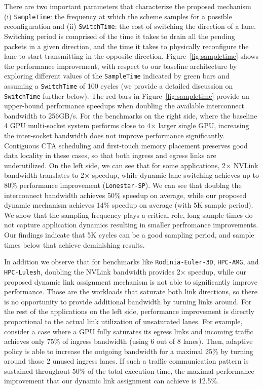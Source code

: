 There are two important parameters that characterize the proposed mechanism (i)
\texttt{SampleTime}: the frequency at which the scheme samples for a possible
reconfiguration and (ii) \texttt{SwitchTime}: the cost of switching the
direction of a lane. Switching period is comprised of the time it takes to
drain all the pending packets in a given direction, and the time it takes to
physically reconfigure the lane to start transmitting in the opposite
direction.  Figure~\ref{fig:sampletime} shows the performance improvement, with
respect to our baseline architecture by exploring different values of the
\texttt{SampleTime} indicated by green bars and assuming a \texttt{SwitchTime}
of 100 cycles (we provide a detailed discussion on \texttt{SwitchTime}
further below). The red bars in Figure~\ref{fig:sampletime} provide an
upper-bound performance speedups when doubling the available interconnect
bandwidth to 256GB/s. For the benchmarks on the right side, where the baseline
4 GPU multi-socket system performs close to 4$\times$ larger single GPU,
increasing the inter-socket bandwidth does not improve performance
significantly.  Contiguous CTA scheduling and first-touch memory placement
preserves good data locality in these cases, so that both ingress and egress
links are underutilized. On the left side, we can see that for some
applications, 2$\times$ NVLink bandwidth translates to 2$\times$ speedup, while
dynamic lane switching achieves up to 80\% performance improvement
(\texttt{Lonestar-SP}).  We can see that doublng the interconnect bandwidth
achieves 50\% speedup on average, while our proposed dynamic mechanism achieves
14\% speedup on average (with 5K sample period). We show that the sampling frequency
plays a critical role, long sample times do not capture application dynamics
resulting in smaller perfromance improvements. Our findings indicate that 5K
cycles can be a good sampling period, and sample times below that achieve
deminishing results.

In addition we observe that for benchmarks like \texttt{Rodinia-Euler-3D}, \texttt{HPC-AMG}, and 
\texttt{HPC-Lulesh}, doubling the NVLink bandwidth provides 2$\times$ 
speedup, while our proposed dynamic link assignment mechanism is not 
able to significantly improve performance. Those are the workloads 
that saturate both link directions, so there is no opportunity to 
provide additional bandwidth by turning links around. For the rest of 
the applications on the left side, performance improvement is directly 
proportional to the actual link utilization of unsaturated lanes. For 
example, consider a case where a GPU fully saturates its egress links 
and incoming traffic achieves only 75\% of ingress bandwidth (using 6 
out of 8 lanes). Then, adaptive policy is able to increase the outgoing 
bandwidth for a maximal 25\% by turning around those 2 unused ingress 
lanes. If such a traffic communication pattern is sustained throughout 
50\% of the total execution time, the maximal performance improvement 
that our dynamic link assignment can achieve is 12.5\%.

